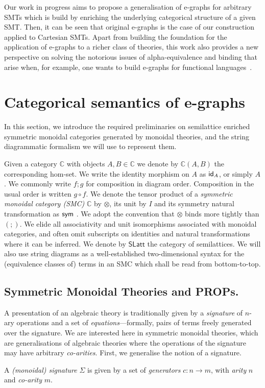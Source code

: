 \documentclass[sigconf, 9pt, nonacm]{acmart}
\begin{document}
Our work in progress aims to propose a generalisation of e-graphs for arbitrary SMTs which is build by enriching the underlying categorical structure of a given SMT.
Then, it can be seen that original e-graphs is the case of our construction applied to Cartesian SMTs.
Apart from building the foundation for the application of e-graphs to a richer class of theories, this work also provides a new perspective on solving the notorious issues of alpha-equivalence and binding that arise when, for example, one wants to build e-graphs for functional languages~\cite{koehler2022sketchguided}.

\section{Categorical semantics of e-graphs}

In this section,  we introduce the required preliminaries on semilattice enriched symmetric monoidal categories generated by monoidal theories,  and the string diagrammatic formalism we will use to represent them.  

Given a category $\mathbb{C}$  with objects $A,B \in \mathbb{C}$ we denote by $\mathbb{C}(A,B)$ the corresponding hom-set.  We write the identity morphism on $A$ as $\textsf{id}_A$,  or simply $A$.  We commonly write $f;g$ for composition in diagram order.  Composition in the usual order is written $g \circ f$.  We denote the tensor product of a \textit{symmetric monoidal category (SMC)} $\mathbb{C}$ by $\otimes$,  its unit by $I$ and its symmetry natural transformation as $\textsf{sym}$ \cite{maclane}.  We adopt the convention that $\otimes$ binds more tightly than $(;\!)$.  We elide all associativity and unit isomorphisms associated with monoidal categories,  and often omit subscripts on identities and natural transformations where it can be inferred.  We denote by $\textsf{SLatt}$ the category of semilattices.
We will also use string diagrams as a well-established two-dimensional syntax for the (equivalence classes of) terms in an SMC which shall be read from bottom-to-top.


\subsection{Symmetric Monoidal Theories and PROPs.}

A presentation of an algebraic theory is traditionally given by a \textit{signature} of $n$-ary operations and a set of \textit{equations}---formally,  pairs of terms freely generated over the signature.  We are interested here in symmetric monoidal theories, which are generalisations of algebraic theories where the operations of the signature may have arbitrary \textit{co-arities}.  First,  we generalise the notion of a signature. 
\begin{definition}
A \textit{(monoidal) signature} $\Sigma$ is given by a set of \textit{generators} $c: n \to m$,  with \textit{arity} $n$ and \textit{co-arity} $m$.  %
\end{definition}
\end{document}

